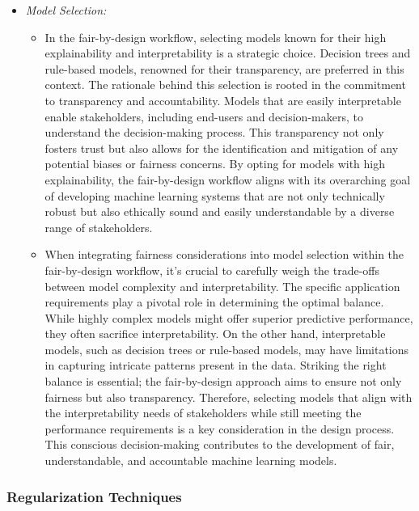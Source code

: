 \documentclass[12pt,a4paper,openright,twoside]{book}
\begin{document}
\begin{itemize}

    \item \emph{Model Selection:}

    \begin{itemize}

        \item In the fair-by-design workflow, selecting models known for their high explainability and interpretability is a strategic choice. Decision trees and rule-based models, renowned for their transparency, are preferred in this context. The rationale behind this selection is rooted in the commitment to transparency and accountability. Models that are easily interpretable enable stakeholders, including end-users and decision-makers, to understand the decision-making process. This transparency not only fosters trust but also allows for the identification and mitigation of any potential biases or fairness concerns. By opting for models with high explainability, the fair-by-design workflow aligns with its overarching goal of developing machine learning systems that are not only technically robust but also ethically sound and easily understandable by a diverse range of stakeholders.

        \item When integrating fairness considerations into model selection within the fair-by-design workflow, it's crucial to carefully weigh the trade-offs between model complexity and interpretability. The specific application requirements play a pivotal role in determining the optimal balance. While highly complex models might offer superior predictive performance, they often sacrifice interpretability. On the other hand, interpretable models, such as decision trees or rule-based models, may have limitations in capturing intricate patterns present in the data. Striking the right balance is essential; the fair-by-design approach aims to ensure not only fairness but also transparency. Therefore, selecting models that align with the interpretability needs of stakeholders while still meeting the performance requirements is a key consideration in the design process. This conscious decision-making contributes to the development of fair, understandable, and accountable machine learning models.

    \end{itemize}

\end{itemize}

\subsubsection{Regularization Techniques}
\end{document}
